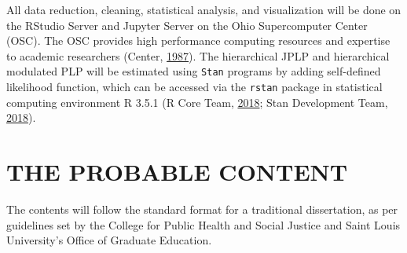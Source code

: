 \documentclass[12pt]{book}
\numberwithin{equation}{chapter}
\begin{document}
All data reduction, cleaning, statistical analysis, and visualization will be done on the RStudio Server and Jupyter Server on the Ohio Supercomputer Center (OSC). The OSC provides high performance computing resources and expertise to academic researchers (Center, \protect\hyperlink{ref-OSC1987}{1987}). The hierarchical JPLP and hierarchical modulated PLP will be estimated using \texttt{Stan} programs by adding self-defined likelihood function, which can be accessed via the \texttt{rstan} package in statistical computing environment R 3.5.1 (R Core Team, \protect\hyperlink{ref-Rcitation}{2018}; Stan Development Team, \protect\hyperlink{ref-rstancitation}{2018}).

\hypertarget{the-probable-content}{%
\chapter{THE PROBABLE CONTENT}\label{the-probable-content}}

The contents will follow the standard format for a traditional dissertation, as per guidelines set by the College for Public Health and Social Justice and Saint Louis University's Office of Graduate Education.

\linespread{1}
\end{document}

